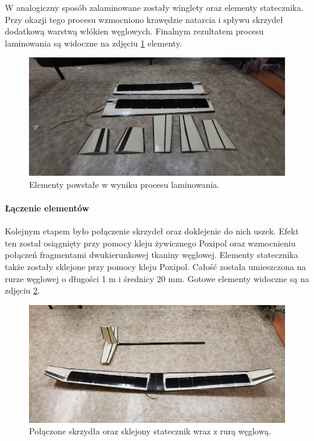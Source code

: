 \documentclass[12pt, a4paper]{article}
\begin{document}
W analogiczny sposób zalaminowane zostały winglety oraz elementy statecznika. Przy okazji tego procesu wzmocniono krawędzie natarcia i spływu skrzydeł dodatkową warstwą włókien węglowych. Finalnym rezultatem procesu laminowania są widoczne na zdjęciu \ref{fig:kompozytki} elementy.

 \begin{figure}[ht]
    \centering
    \includegraphics[width=1\textwidth]{budowa11}
    \caption{Elementy powstałe w wyniku procesu laminowania.}
    \label{fig:kompozytki}
\end{figure}

\FloatBarrier
\paragraph{Łączenie elementów}\mbox{}

Kolejnym etapem było połączenie skrzydeł oraz doklejenie do nich uszek. Efekt ten został osiągnięty przy pomocy kleju żywicznego Poxipol oraz wzmocnieniu połączeń fragmentami dwukierunkowej tkaniny węglowej. Elementy statecznika także zostały sklejone przy pomocy kleju Poxipol. Całość została umieszczona na rurze węglowej o długości 1 m i średnicy 20 mm. Gotowe elementy widoczne są na zdjęciu \ref{fig:sklejone}.

 \begin{figure}[ht]
    \centering
    \includegraphics[width=1\textwidth]{budowa13}
    \caption{Połączone skrzydła oraz sklejony statecznik wraz z rurą węglową.}
    \label{fig:sklejone}
\end{figure}
\end{document}
